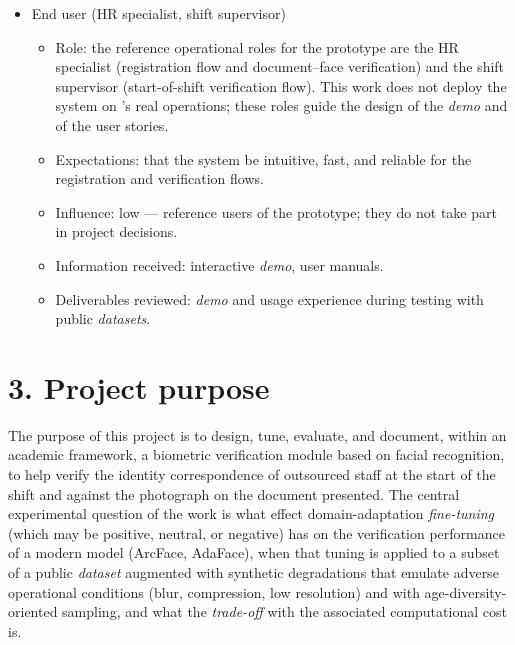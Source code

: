 \documentclass[
  11pt, %
]{charter}
\begin{document}
\begin{itemize}
\begin{itemize}
      \item Expectations: to complete the final project with quality, within the estimated time frame and hours.
      \item Influence: medium --- executes and documents, but depends on decisions made by the client and the advisor.
      \item Information received: meetings with the client and the advisor, feedback on deliverables.
      \item Deliverables reviewed: all the code, the technical documentation, and the final project report.
    \end{itemize}
  \item End user (HR specialist, shift supervisor)
    \begin{itemize}
      \item Role: the reference operational roles for the prototype are the HR specialist (registration flow and document--face verification) and the shift supervisor (start-of-shift verification flow). This work does not deploy the system on \empclientename's real operations; these roles guide the design of the \textit{demo} and of the user stories.
      \item Expectations: that the system be intuitive, fast, and reliable for the registration and verification flows.
      \item Influence: low --- reference users of the prototype; they do not take part in project decisions.
      \item Information received: interactive \textit{demo}, user manuals.
      \item Deliverables reviewed: \textit{demo} and usage experience during testing with public \textit{datasets}.
    \end{itemize}
\end{itemize}

\section{3. Project purpose}
\label{sec:proposito}

The purpose of this project is to design, tune, evaluate, and document, within an academic framework, a biometric verification module based on facial recognition, to help verify the identity correspondence of outsourced staff at the start of the shift and against the photograph on the document presented. The central experimental question of the work is what effect domain-adaptation \textit{fine-tuning} (which may be positive, neutral, or negative) has on the verification performance of a modern model (ArcFace, AdaFace), when that tuning is applied to a subset of a public \textit{dataset} augmented with synthetic degradations that emulate adverse operational conditions (blur, compression, low resolution) and with age-diversity-oriented sampling, and what the \textit{trade-off} with the associated computational cost is.
\end{document}
